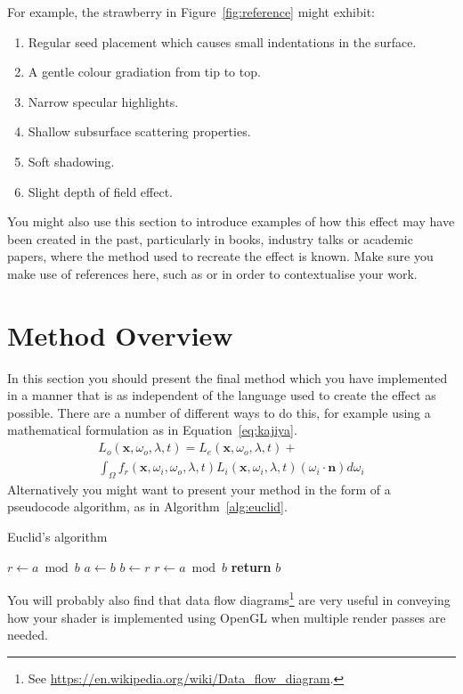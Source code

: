 \documentclass[]{acmsiggraph}
\begin{document}
For example, the strawberry in Figure~\ref{fig:reference} might exhibit:
\begin{enumerate}
 \item Regular seed placement which causes small indentations in the surface.
 \item A gentle colour gradiation from tip to top.
 \item Narrow specular highlights.
 \item Shallow subsurface scattering properties.
 \item Soft shadowing.
 \item Slight depth of field effect.
\end{enumerate}
You might also use this section to introduce examples of how this effect may have been created in the past, particularly in books, industry talks or academic papers, where the method used to recreate the effect is known. Make sure you make use of references here, such as \cite{rtr08} or \cite{pbr10} in order to contextualise your work.

\section{Method Overview} \label{sec:overview}
In this section you should present the final method which you have implemented in a manner that is as independent of the language used to create the effect as possible. There are a number of different ways to do this, for example using a mathematical formulation as in Equation~\ref{eq:kajiya}.
\begin{multline}\label{eq:kajiya}
L_o \left( \mathbf{x},\omega_o,\lambda,t \right) = L_e\left(\mathbf{x},\omega_o,\lambda,t \right) + \\
   \int_\Omega f_r \left(\mathbf{x},\omega_i,\omega_o,\lambda,t\right) L_i\left(\mathbf{x},\omega_i,\lambda,t\right) \left(\omega_i \cdot \mathbf{n}\right) d\omega_i
\end{multline}
Alternatively you might want to present your method in the form of a pseudocode algorithm, as in Algorithm~\ref{alg:euclid}.
\begin{algorithm}
\caption{Euclid’s algorithm}\label{alg:euclid}
\begin{algorithmic}[1]
\State $r\gets a\bmod b$
\State $a\gets b$
\State $b\gets r$
\State $r\gets a\bmod b$
\EndWhile\label{euclidendwhile}
\State \textbf{return} $b$
\EndProcedure
\end{algorithmic}
\end{algorithm}
You will probably also find that data flow diagrams\footnote{See \url{https://en.wikipedia.org/wiki/Data_flow_diagram}.} are very useful in conveying how your shader is implemented using OpenGL when multiple render passes are needed.
\end{document}
